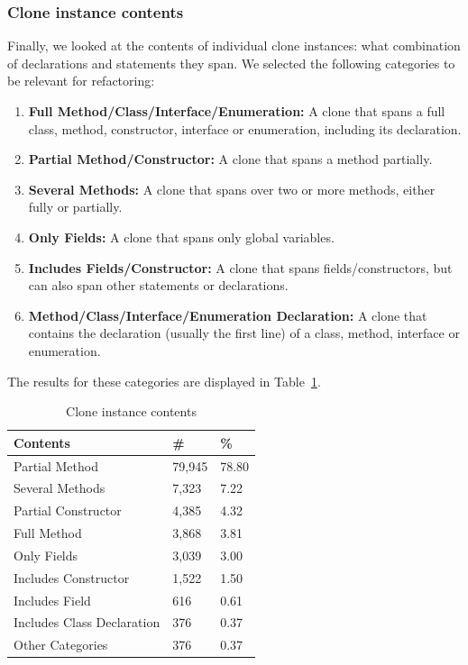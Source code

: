 \documentclass[a4paper]{article}
\begin{document}
\subsubsection{Clone instance contents}\label{chap:clonecontents}
Finally, we looked at the contents of individual clone instances: what combination of declarations and statements they span. We selected the following categories to be relevant for refactoring:
\begin{enumerate}
  \item \textbf{Full Method/Class/Interface/Enumeration:} A clone that spans a full class, method, constructor, interface or enumeration, including its declaration.
  \item \textbf{Partial Method/Constructor:} A clone that spans a method partially.
  \item \textbf{Several Methods:} A clone that spans over two or more methods, either fully or partially.
  \item \textbf{Only Fields:} A clone that spans only global variables.
  \item \textbf{Includes Fields/Constructor:} A clone that spans fields/constructors, but can also span other statements or declarations.
  \item \textbf{Method/Class/Interface/Enumeration Declaration:} A clone that contains the declaration (usually the first line) of a class, method, interface or enumeration.
\end{enumerate}

The results for these categories are displayed in Table~\ref{table:contents}.

\begin{table}[H]
  \begin{center}
  \caption{Clone instance contents} \label{table:contents}
  \medskip
\begin{tabular}{|l|l|l|}
  \hline
  \textbf{Contents} & \textbf{\#} & \textbf{\%} \\ \hline
  Partial Method     & 79,945 & 78.80 \\ \hline
  Several Methods         & 7,323 & 7.22 \\ \hline
  Partial Constructor      & 4,385 & 4.32 \\ \hline
  Full Method           & 3,868 & 3.81 \\ \hline
  Only Fields           & 3,039 & 3.00 \\ \hline
  Includes Constructor  & 1,522 & 1.50 \\ \hline
  Includes Field        & 616 & 0.61 \\ \hline
  Includes Class Declaration  & 376 & 0.37 \\ \hline
  Other Categories    & 376 & 0.37\\ \hline
\end{tabular}
\end{center}
\end{table}
\end{document}
